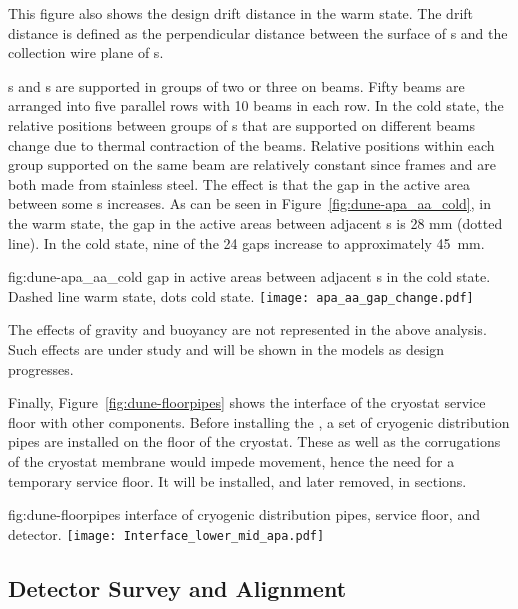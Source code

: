 This figure also shows the design drift distance in the warm
state. The drift distance is defined as the perpendicular distance
between the surface of s and the collection wire plane of
s.

s and s are supported in groups of two or three
on  beams. Fifty beams are arranged into five parallel rows
with 10 beams in each row.  In the cold state, the relative positions
between groups of s that are supported on different beams
change due to thermal contraction of the beams. Relative positions
within each group supported on the same beam are relatively constant
since  frames and  are both made from stainless
steel.  The effect is that the gap in the active area between some
s increases.  As can be seen in
Figure~\ref{fig:dune-apa_aa_cold}, in the warm state, the gap in the
active areas between adjacent s is 28 mm (dotted line). In
the cold state, nine of the 24 gaps increase to approximately 45~mm.
\begin{dunefigure}{fig:dune-apa_aa_cold} 
    { gap in active areas between adjacent s
      in the cold state. Dashed line warm state, dots cold state.}
    \texttt{[image: apa\_aa\_gap\_change.pdf]}
\end{dunefigure}

The effects of gravity and buoyancy are not represented in the above
analysis. Such effects are under study and will be shown in the models
as design progresses.

Finally, Figure~\ref{fig:dune-floorpipes} shows the interface of the
cryostat service floor with other components.  Before installing the
, a set of cryogenic distribution pipes are installed
on the floor of the cryostat. These as well as the corrugations of the
cryostat membrane would impede movement, hence the need for
a temporary service floor. It will be installed, and later removed, in sections. 
\begin{dunefigure}{fig:dune-floorpipes}
{ interface of cryogenic distribution pipes, service
  floor, and detector.}
\texttt{[image: Interface\_lower\_mid\_apa.pdf]}
\end{dunefigure}

\subsection{Detector Survey and Alignment}
\label{sec:fdsp-coord-integ-survey}

